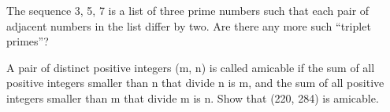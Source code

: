 \documentclass[addpoints,12pt]{exam}
\begin{document}
\begin{questions}

\question The sequence 3, 5, 7 is a list of three prime numbers such that each
pair of adjacent numbers in the list differ by two. Are there any more
such “triplet primes”?
\question A pair of distinct positive integers (m, n) is called amicable if the sum
of all positive integers smaller than n that divide n is m, and the sum
of all positive integers smaller than m that divide m is n. Show that
(220, 284) is amicable.

\end{questions}
\end{document}
